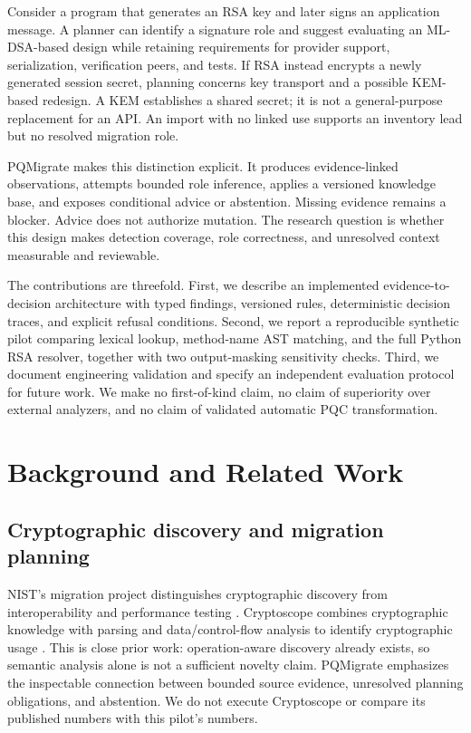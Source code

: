 \documentclass[conference,a4paper]{IEEEtran}
\begin{document}
Consider a program that generates an RSA key and later signs an application message. A planner can identify a signature role and suggest evaluating an ML-DSA-based design while retaining requirements for provider support, serialization, verification peers, and tests. If RSA instead encrypts a newly generated session secret, planning concerns key transport and a possible KEM-based redesign. A KEM establishes a shared secret; it is not a general-purpose replacement for an  API. An import with no linked use supports an inventory lead but no resolved migration role.

PQMigrate makes this distinction explicit. It produces evidence-linked observations, attempts bounded role inference, applies a versioned knowledge base, and exposes conditional advice or abstention. Missing evidence remains a blocker. Advice does not authorize mutation. The research question is whether this design makes detection coverage, role correctness, and unresolved context measurable and reviewable.

The contributions are threefold. First, we describe an implemented evidence-to-decision architecture with typed findings, versioned rules, deterministic decision traces, and explicit refusal conditions. Second, we report a reproducible synthetic pilot comparing lexical lookup, method-name AST matching, and the full Python RSA resolver, together with two output-masking sensitivity checks. Third, we document engineering validation and specify an independent evaluation protocol for future work. We make no first-of-kind claim, no claim of superiority over external analyzers, and no claim of validated automatic PQC transformation.

\section{Background and Related Work}

\subsection{Cryptographic discovery and migration planning}

NIST's migration project distinguishes cryptographic discovery from interoperability and performance testing \cite{ref5}. Cryptoscope combines cryptographic knowledge with parsing and data/control-flow analysis to identify cryptographic usage \cite{ref6}. This is close prior work: operation-aware discovery already exists, so semantic analysis alone is not a sufficient novelty claim. PQMigrate emphasizes the inspectable connection between bounded source evidence, unresolved planning obligations, and abstention. We do not execute Cryptoscope or compare its published numbers with this pilot's numbers.
\end{document}
